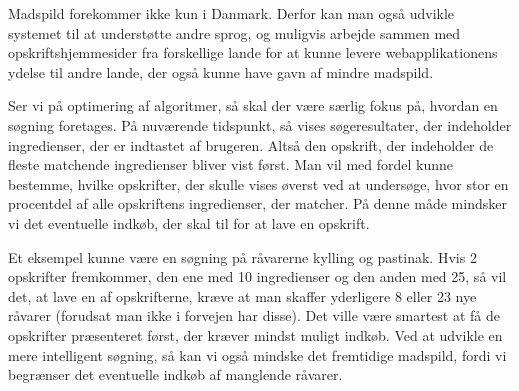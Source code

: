 Madspild forekommer ikke kun i Danmark. Derfor kan man også udvikle systemet til at understøtte andre sprog, og muligvis arbejde sammen med opskriftshjemmesider fra forskellige lande for at kunne levere webapplikationens ydelse til andre lande, der også kunne have gavn af mindre madspild.

Ser vi på optimering af algoritmer, så skal der være særlig fokus på, hvordan en søgning foretages. På nuværende tidspunkt, så vises søgeresultater, der indeholder ingredienser, der er indtastet af brugeren. Altså den opskrift, der indeholder de fleste matchende ingredienser bliver vist først. Man vil med fordel kunne bestemme, hvilke opskrifter, der skulle vises øverst ved at undersøge, hvor stor en procentdel af alle opskriftens ingredienser, der matcher. På denne måde mindsker vi det eventuelle indkøb, der skal til for at lave en opskrift. 

Et eksempel kunne være en søgning på råvarerne kylling og pastinak. Hvis 2 opskrifter fremkommer, den ene med 10 ingredienser og den anden med 25, så vil det, at lave en af opskrifterne, kræve at man skaffer yderligere 8 eller 23 nye råvarer (forudsat man ikke i forvejen har disse). Det ville være smartest at få de opskrifter præsenteret først, der kræver mindst muligt indkøb. Ved at udvikle en mere intelligent søgning, så kan vi også mindske det fremtidige madspild, fordi vi begrænser det eventuelle indkøb af manglende råvarer.